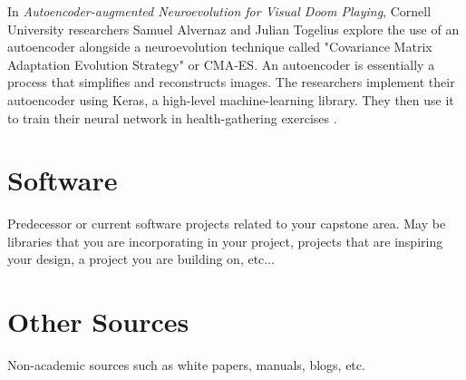 In {\it Autoencoder-augmented Neuroevolution for Visual Doom Playing}, Cornell University researchers Samuel Alvernaz and Julian Togelius explore the use of an autoencoder alongside a neuroevolution technique called "Covariance Matrix Adaptation Evolution Strategy" or CMA-ES. An autoencoder is essentially a process that simplifies and reconstructs images. The researchers implement their autoencoder using Keras, a high-level machine-learning library. They then use it to train their neural network in health-gathering exercises \cite{Alvernaz:2017}.




\section{Software}

Predecessor or current software projects related to your capstone area. May be libraries that you are incorporating in your project, projects that are inspiring your design, a project you are building on, etc...




\section{Other Sources}

Non-academic sources such as white papers, manuals, blogs, etc.

